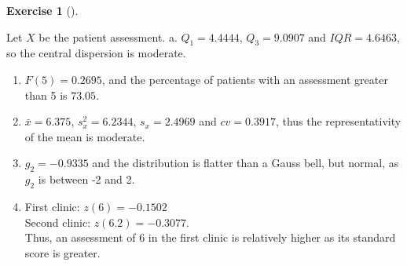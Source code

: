 \documentclass[
  a4paper,
]{scrreport}
\theoremstyle{definition}
\newtheorem{exercise}{Exercise}[chapter]
\theoremstyle{remark}
\begin{document}
\begin{exercise}[]
\begin{tcolorbox}
Let \(X\) be the patient assessment. a. \(Q_1= 4.4444\), \(Q_3=9.0907\)
and \(IQR = 4.6463\), so the central dispersion is moderate.

\begin{enumerate}
\def\labelenumi{\alph{enumi}.}
\item
  \(F(5)=0.2695\), and the percentage of patients with an assessment
  greater than 5 is \(73.05%
  \).
\item
  \(\bar x = 6.375\), \(s_x^2 = 6.2344\), \(s_x=2.4969\) and
  \(cv=0.3917\), thus the representativity of the mean is moderate.
\item
  \(g_2 = -0.9335\) and the distribution is flatter than a Gauss bell,
  but normal, as \(g_2\) is between -2 and 2.
\item
  First clinic: \(z(6)=-0.1502\)\\
  Second clinic: \(z(6.2)=-0.3077\).\\
  Thus, an assessment of 6 in the first clinic is relatively higher as
  its standard score is greater.
\end{enumerate}

\end{tcolorbox}

\end{exercise}
\end{document}
